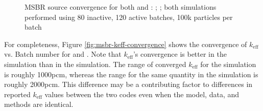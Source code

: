 \begin{figure}[htpb]
    \centering
    \caption[MSBR source convergence]{MSBR source convergence
        for both \OpenMC and \SerpentTWO:
         \OpenMC;
         \SerpentTWO;
        both simulations performed using 80 inactive, 120 active batches,
        100k particles per batch
    }
    \label{fig:msbr-source-convergence}
\end{figure}

For completeness, Figure \ref{fig:msbr-keff-convergence} shows the convergence
of $k_{\text{eff}}$ vs. Batch number for \OpenMC and \SerpentTWO. Note that
$k_{\text{eff}}$'s convergence is better in the \SerpentTWO simulation
than in the \OpenMC simulation. The range of converged $k_{\text{eff}}$ for
the \SerpentTWO simulation is roughly 1000pcm, whereas the range for
the same quantity in the \OpenMC simulation is roughly 2000pcm. This
difference may be a contributing factor to differences in reported $k_{\text{eff}}$
values between the two codes even when the model, data, and methods are
identical.

